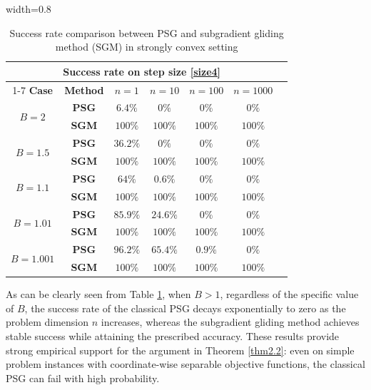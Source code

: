 \documentclass[sn-mathphys]{JORSC-jnl}%
\theoremstyle{thmstyleone}%
\theoremstyle{thmstylethree}%
\begin{document}
\begin{table}[htbp]
	\centering
	\caption{Success rate comparison between PSG and subgradient gliding method (SGM) in strongly convex setting}
	\begin{adjustbox}{width=0.8\textwidth}
		\begin{tabular}{ccccccc}
			\toprule %
			\multicolumn{6}{c}{\textbf{Success rate on step size \eqref{size4}}} & \\
			\cmidrule{1-7} %
			\textbf{Case} & \textbf{Method} & \textbf{$n=1$} & \textbf{$n=10$} & $n=100$ & $n=1000$&\\
			\midrule %
			\multirow{2}{*}{\textbf{$B=2$}} & \textbf{PSG}& $6.4\%$& $0\%$& $0\%$& $0\%$&\\
			\cmidrule{2-7}
			& \textbf{SGM} & $100\%$ & $100\%$ & $100\%$ & $100\%$ &\\
			\midrule %
			\multirow{2}{*}{\textbf{$B=1.5$}} & \textbf{PSG}& $36.2\%$& $0\%$& $0\%$& $0\%$&\\
			\cmidrule{2-7}
			& \textbf{SGM} & $100\%$ & $100\%$ & $100\%$ & $100\%$ &\\
			\midrule %
			\multirow{2}{*}{\textbf{$B=1.1$}} & \textbf{PSG}& $64\%$& $0.6\%$& $0\%$& $0\%$&\\
			\cmidrule{2-7}
			& \textbf{SGM} & $100\%$ & $100\%$ & $100\%$ & $100\%$ &\\
			\midrule %
			\multirow{2}{*}{\textbf{$B=1.01$}} & \textbf{PSG}& $85.9\%$& $24.6\%$& $0\%$& $0\%$&\\
			\cmidrule{2-7}
			& \textbf{SGM} & $100\%$ & $100\%$ & $100\%$ & $100\%$ &\\
			\midrule %
			\multirow{2}{*}{\textbf{$B=1.001$}} & \textbf{PSG}& $96.2\%$& $65.4\%$& $0.9\%$& $0\%$&\\
			\cmidrule{2-7}
			& \textbf{SGM} & $100\%$ & $100\%$ & $100\%$ & $100\%$ &\\
			\bottomrule %
		\end{tabular}
	\end{adjustbox}
	\label{tab:success_rate3}
\end{table}

As can be clearly seen from Table \ref{tab:success_rate3}, when $B > 1$, regardless of the specific value of $B$, the success rate of the classical PSG decays exponentially to zero as the problem dimension $n$ increases, whereas the subgradient gliding method achieves stable success while attaining the prescribed accuracy. These results provide strong empirical support for the argument in Theorem \ref{thm2.2}: even on simple problem instances with coordinate-wise separable objective functions, the classical PSG can fail with high probability.
\end{document}
